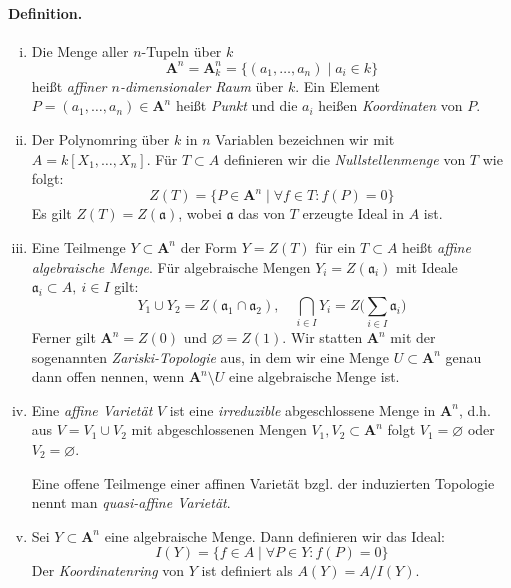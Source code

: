 \documentclass[11pt,b5paper,openany]{memoir}
\begin{document}
\paragraph{Definition.} \begin{enumerate}[(i)]
\item Die Menge aller $n$-Tupeln über $k$
\[\mathbf{A}^n = \mathbf{A}_k^n = \{(a_1,\ldots,a_n)\mid a_i\in k\} \]
heißt \textit{affiner $n$-dimensionaler Raum} über $k$. Ein Element $P=(a_1,\ldots,a_n)\in\mathbf{A}^n$ heißt \textit{Punkt} und die $a_i$ heißen \textit{Koordinaten} von $P$.
\item Der Polynomring über $k$ in $n$ Variablen bezeichnen wir mit $A=k[X_1,\ldots,X_n]$. Für $T\subset A$ definieren wir die \textit{Nullstellenmenge} von $T$ wie folgt:
\[Z(T)=\{P\in\mathbf{A}^n\mid \forall f\in T\colon f(P)=0\} \]
Es gilt $Z(T)=Z(\mathfrak{a})$, wobei $\mathfrak{a}$ das von $T$ erzeugte Ideal in $A$ ist.
\item Eine Teilmenge $Y\subset\mathbf{A}^n$ der Form $Y=Z(T)$ für ein $T\subset A$ heißt \textit{affine algebraische Menge}. Für algebraische Mengen $Y_i=Z(\mathfrak{a}_i)$ mit Ideale $\mathfrak{a}_i\subset A,\ i\in I$ gilt:
\[Y_1\cup Y_2=Z(\mathfrak{a}_1\cap\mathfrak{a}_2),\quad \bigcap_{i\in I}Y_i = Z\Big(\sum_{i\in I}\mathfrak{a}_i\Big) \]
Ferner gilt $\mathbf{A}^n=Z(0)$ und $\varnothing = Z(1)$. Wir statten $\mathbf{A}^n$ mit der sogenannten \textit{Zariski-Topologie} aus, in dem wir eine Menge $U\subset\mathbf{A}^n$ genau dann offen nennen, wenn $\mathbf{A}^n\setminus U$ eine algebraische Menge ist.
\item Eine \textit{affine Varietät} $V$ ist eine \textit{irreduzible} abgeschlossene Menge in $\mathbf{A}^n$, d.h. aus $V=V_1\cup V_2$ mit abgeschlossenen Mengen $V_1,V_2\subset\mathbf{A}^n$ folgt $V_1=\varnothing$ oder $V_2=\varnothing$. 

Eine offene Teilmenge einer affinen Varietät bzgl. der induzierten Topologie nennt man \textit{quasi-affine Varietät}. 
\item Sei $Y\subset\mathbf{A}^n$ eine algebraische Menge. Dann definieren wir das Ideal:
\[I(Y)=\{f\in A\mid \forall P\in Y\colon f(P)=0\} \]
Der \textit{Koordinatenring} von $Y$ ist definiert als $A(Y)=A/I(Y)$.
\end{enumerate}
\end{document}
